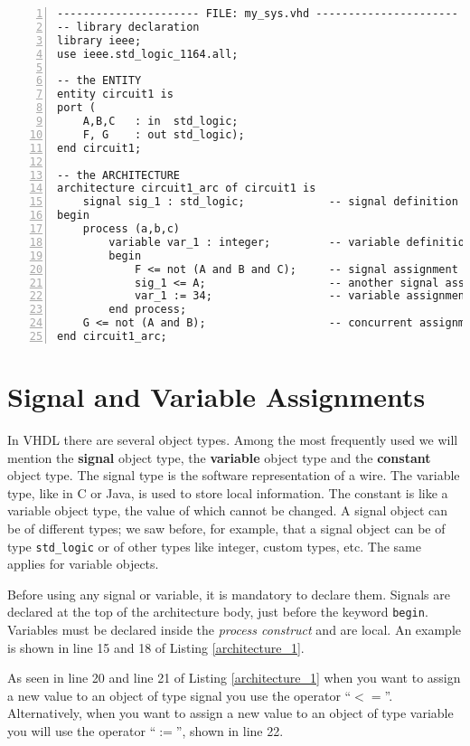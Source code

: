 \begin{lstlisting}[float, numbers=left, label=architecture_1, caption=Example of a simple VHDL block.]
---------------------- FILE: my_sys.vhd ----------------------
-- library declaration
library ieee;
use ieee.std_logic_1164.all;

-- the ENTITY
entity circuit1 is
port (
    A,B,C   : in  std_logic;
    F, G    : out std_logic);
end circuit1;

-- the ARCHITECTURE
architecture circuit1_arc of circuit1 is
	signal sig_1 : std_logic;             -- signal definition
begin
    process (a,b,c)
        variable var_1 : integer;         -- variable definition
        begin
            F <= not (A and B and C);     -- signal assignment
	        sig_1 <= A;                   -- another signal assignment
	        var_1 := 34;                  -- variable assignment
        end process;
    G <= not (A and B);                   -- concurrent assignment 
end circuit1_arc;
\end{lstlisting}

\section{Signal and Variable Assignments}
In VHDL there are several object types. Among the most frequently used we will mention the \textbf{signal} object type, the \textbf{variable} object type and the \textbf{constant} object type. The signal type is the software representation of a wire. The variable type, like in C or Java, is used to store local information. The constant is like a variable object type, the value of which cannot be changed. A signal object can be of different types; we saw before, for example, that a signal object can be of type \texttt{std\_logic} or of other types like integer, custom types, etc. The same applies for variable objects.

Before using any signal or variable, it is mandatory to declare them. Signals are declared at the top of the architecture body, just before the keyword \texttt{begin}. Variables must be declared inside the \textit{process construct} and are local. An example is shown in line 15 and 18 of Listing \ref{architecture_1}.

As seen in line 20 and line 21 of Listing \ref{architecture_1} when you want to assign a new value to an object of type signal you use the operator ``$<=$''. Alternatively, when you want to assign a new value to an object of type variable you will use the operator ``$:=$'', shown in line 22.

